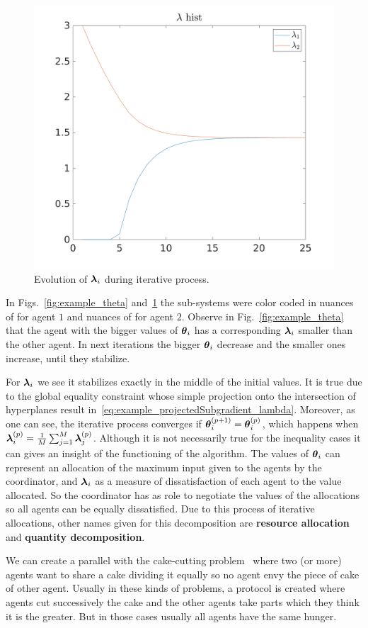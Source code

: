 \documentclass[../main.tex]{subfiles}
\begin{document}
\begin{figure}[h]
  \centering
  \includegraphics[width=.5\textwidth]{../img/example_lambda.png}
  \caption{Evolution of $\boldsymbol{\lambda}_i$ during iterative process. }\label{fig:example_lambda}
\end{figure}
In Figs.~\ref{fig:example_theta} and~\ref{fig:example_lambda} the sub-systems were color coded in nuances of  for agent $1$ and nuances of  for agent $2$.
Observe in Fig.~\ref{fig:example_theta} that the agent with the bigger values of $\boldsymbol{\theta}_i$ has a corresponding $\boldsymbol{\lambda}_i$ smaller than the other agent.
In next iterations the bigger $\boldsymbol{\theta}_i$ decrease and the smaller ones increase, until they stabilize.

For $\boldsymbol{\lambda}_i$ we see it stabilizes exactly in the middle of the initial values.
It is true due to the global equality constraint whose simple projection onto the intersection of hyperplanes result in~\eqref{eq:example_projectedSubgradient_lambda}.
Moreover, as one can see, the iterative process converges if ${\boldsymbol{\theta}_i^{(p+1)}=\boldsymbol{\theta}_i^{(p)}}$, which happens when ${\boldsymbol{\lambda}_i^{(p)}=\frac{1}{M}\sum_{j=1}^{M}\boldsymbol{\lambda}_j^{(p)}}$.
Although it is not necessarily true for the inequality cases it can gives an insight of the functioning of the algorithm.
The values of $\boldsymbol{\theta}_i$ can represent an allocation of the maximum input given to the agents by the coordinator, and $\boldsymbol{\lambda}_i$ as a measure of dissatisfaction of each agent to the value allocated.
So the coordinator has as role to negotiate the values of the allocations so all agents can be equally dissatisfied.
Due to this process of iterative allocations, other names given for this decomposition are \textbf{resource allocation} and \textbf{quantity decomposition}.

We can create a parallel with the cake-cutting problem~\cite{BramsTaylor1995} where two (or more) agents want to share a cake dividing it equally so no agent envy the piece of cake of other agent.
Usually in these kinds of problems, a protocol is created where agents cut successively the cake and the other agents take parts which they think it is the greater.
But in those cases usually all agents have the same hunger.
\end{document}
